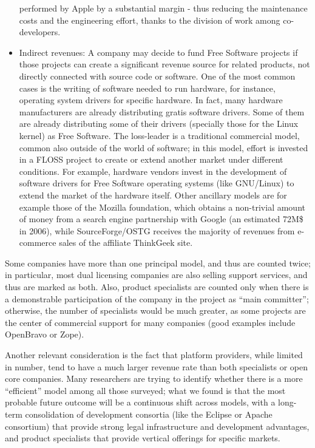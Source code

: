 \begin{itemize}
performed by Apple by a substantial margin - thus reducing the maintenance costs
and the engineering effort, thanks to the division of work among co-developers.
 \item Indirect revenues: A company may decide to fund Free Software projects if
those projects can create a significant revenue source for related products, not
directly connected with source code or software. One of the most common cases is
the writing of software needed to run hardware, for instance, operating system
drivers for specific hardware. In fact, many hardware manufacturers are already
distributing gratis software drivers. Some of them are already distributing some
of their drivers (specially those for the Linux kernel) as Free Software. The
loss-leader is a traditional commercial model, common also outside of the world
of software; in this model, effort is invested in a FLOSS project to
create or extend another market under different conditions. For example,
hardware vendors invest in the development of software drivers for Free Software
operating systems (like GNU/Linux) to extend the market of the hardware itself.
Other ancillary models are for example those of the Mozilla foundation, which
obtains a non-trivial amount of money from a search engine partnership with
Google (an estimated 72M\$ in 2006), while SourceForge/OSTG receives the
majority of revenues from e-commerce sales of the affiliate ThinkGeek site.
\end{itemize}

Some companies have more than one principal model, and thus are counted twice;
in particular, most dual licensing companies are also selling support services,
and thus are marked as both. Also, product specialists are counted only when
there is a demonstrable participation of the company in the project as ``main
committer''; otherwise, the number of specialists would be much greater, as some
projects are the center of commercial support for many companies (good
examples include OpenBravo or Zope).

Another relevant consideration is the fact that platform providers, while
limited in number, tend to have a much larger revenue rate than both specialists
or open core companies. Many researchers are trying to identify whether there is
a more ``efficient'' model among all those surveyed; what we found is that the
most probable future outcome will be a continuous shift across models, with a
long-term consolidation of development consortia (like the Eclipse or Apache
consortium) that provide strong legal infrastructure and development advantages,
and product specialists that provide vertical offerings for specific markets. 

